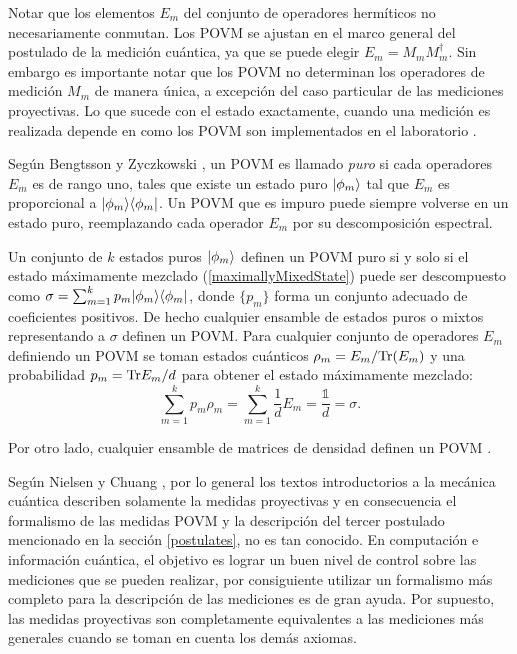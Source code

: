 Notar que los elementos $E_m$ del conjunto de operadores hermíticos no necesariamente conmutan. Los POVM se ajustan en el marco general del
postulado de la medición cuántica, ya que se puede elegir $E_m=M_m
M_m^{\dagger}$. Sin embargo es importante notar que los POVM no determinan los
operadores de medición $M_m$ de manera única, a excepción del caso particular
de las mediciones proyectivas. Lo que sucede con el estado exactamente, cuando
una medición es realizada depende en como los POVM son implementados en el
laboratorio {\cite{2007geometry}}.   

Según Bengtsson y Zyczkowski {\cite{2007geometry}}, un POVM es llamado \textit{puro} si cada operadores $E_m$ es de rango uno, tales que existe un estado puro $|\phi_m\rangle$ tal que $E_m$ es proporcional a $|\phi_m\rangle \langle\phi_m|$. Un POVM que es impuro puede siempre volverse en un estado puro, reemplazando cada operador $E_m$ por su descomposición espectral. 

Un conjunto de $k$ estados puros $|\phi_m \rangle$ definen un POVM puro si y solo si el estado máximamente mezclado (\ref{maximallyMixedState}) puede ser descompuesto como  $\sigma=\sum_{m=1}^{k}p_m|\phi_m\rangle \langle\phi_m|$, donde $\{p_m\}$ forma un conjunto adecuado de coeficientes positivos. De hecho cualquier ensamble de estados puros o mixtos representando a $\sigma$ definen un POVM\@. Para cualquier conjunto de operadores $E_m$ definiendo un POVM se toman estados
cuánticos $\rho_m=E_m/{\rm Tr}(E_m)$ y una probabilidad $p_m={\rm Tr} E_m/d$ para obtener
el estado máximamente mezclado: 
\begin{equation}
	\sum_{m=1}^{k} p_m\rho _{m}=\sum_{m=1}^k \dfrac{1}{d}E_m=\dfrac{\mathds{1}}{d}=\sigma.
\end{equation}

Por otro lado, cualquier ensamble de matrices de densidad definen un POVM
{\cite{2007geometry}}.


Según Nielsen y Chuang {\cite{nielsen_chuang_2010}}, por lo general los textos introductorios a la mecánica cuántica describen solamente la medidas proyectivas y en consecuencia el formalismo de las medidas POVM y la descripción del tercer postulado mencionado en la sección {\ref{postulates}}, no es tan conocido. En computación e información cuántica, el objetivo es lograr un buen nivel de control sobre las mediciones que se pueden realizar, por consiguiente utilizar un formalismo más completo para la descripción de las mediciones es de gran ayuda. Por supuesto, las medidas proyectivas son completamente equivalentes a las mediciones más generales cuando se toman en cuenta los demás axiomas.



